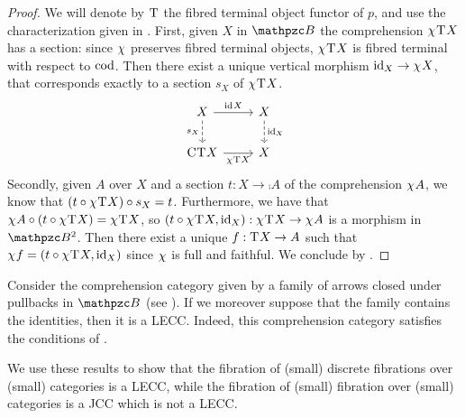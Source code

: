 \documentclass{lmcs} %
\theoremstyle{plain}\newtheorem{satz}[thm]{Satz} %
\begin{document}
			\begin{proof}
We will denote by $\mathrm{T}^{}$ the fibred terminal object functor of $p$, and use the characterization given in . First, given $X$ in $\ct{B}$ the comprehension $\chi^{}\mathrm{T}^{}X$ has a section: since $\chi^{}$ preserves fibred terminal objects, $\chi^{}\mathrm{T}^{}X$ is fibred terminal with respect to $\mathop{\mathrm{cod}}\nolimits$. Then there exist a unique vertical morphism $\mathrm{id}_{X}\to \chi^{}X$, that corresponds exactly to a section $s_X$ of $\chi^{}\mathrm{T}^{}X$.
				\[\begin{tikzcd}
					X & X \\
					{\comp{}\term{}X} & X
					\arrow["{\id{}X}", from=1-1, to=1-2]
					\arrow["{s_X}"', dashed, from=1-1, to=2-1]
					\arrow["{\id{X}}", dashed, from=1-2, to=2-2]
					\arrow["{\jcomp{}\term{}X}"', from=2-1, to=2-2]
				\end{tikzcd}\]
				Secondly, given $A$ over $X$ and a section $t:X\to\comp{}A$ of the comprehension $\chi^{}A$, we know that $(t\circ\chi^{}\mathrm{T}^{}X)\circ s_X=t$. Furthermore, we have that $\chi^{}A\circ (t\circ\chi^{}\mathrm{T}^{}X)=\chi^{}\mathrm{T}^{}X$, so $(t\circ\chi^{}\mathrm{T}^{}X, \mathrm{id}_{X}):\chi^{}\mathrm{T}^{}X\to \chi^{}A$ is a morphism in $\Arr{\ct{B}}$. Then there exist a unique $f:\mathrm{T}^{}X\to A$ such that $\chi^{}f=(t\circ\chi^{}\mathrm{T}^{}X, \mathrm{id}_{X})$ since $\chi^{}$ is full and faithful.
				We conclude by .
			\end{proof}

			\begin{exa}
				Consider the comprehension category given by a family of arrows closed under pullbacks in $\ct{B}$ (see ). If we moreover suppose that the family contains the identities, then it is a LECC.
% 
				Indeed, this comprehension category satisfies the conditions of .
			\end{exa}

			We use these results to show that the fibration of (small) discrete fibrations over (small) categories is a LECC, while the fibration of (small) fibration over (small) categories is a JCC which is not a LECC.
			
\end{document}

